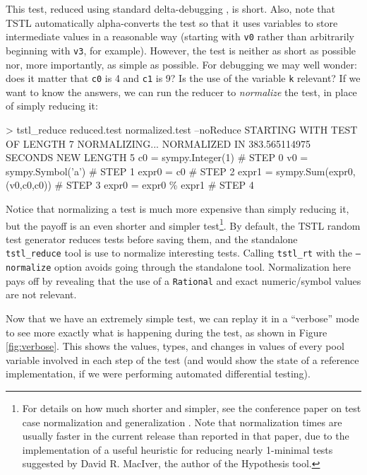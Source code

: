 This test, reduced using standard delta-debugging \cite{DD}, is
short.  Also, note that TSTL automatically alpha-converts the test so
that it uses variables to store intermediate values in a reasonable
way (starting with {\tt v0} rather than arbitrarily beginning with
{\tt v3}, for example).  However, the test is neither as short as possible nor, more
importantly, as simple as possible.  For debugging we may well wonder:
does it matter that {\tt c0} is 4 and {\tt c1} is 9?  Is the use of
the variable {\tt k} relevant?  If we want to know the answers, we can
run the reducer to \emph{normalize} \cite{OneTest} the test, in place
of simply reducing it:

{\scriptsize
\begin{code}
 > tstl\_reduce reduced.test normalized.test --noReduce
 STARTING WITH TEST OF LENGTH 7
 NORMALIZING...
 NORMALIZED IN 383.565114975 SECONDS
 NEW LENGTH 5
 c0 = sympy.Integer(1)                            \# STEP 0
 v0 = sympy.Symbol('a')                           \# STEP 1
 expr0 = c0                                       \# STEP 2
 expr1 = sympy.Sum(expr0,(v0,c0,c0))              \# STEP 3
 expr0 = expr0 \% expr1                            \# STEP 4
\end{code}
}

Notice that normalizing a test is much more expensive than simply
reducing it, but the payoff is an even shorter and simpler
test\footnote{For details on how much shorter and simpler, see the
  conference paper on test case normalization and generalization
  \cite{OneTest}.  Note that normalization times are usually faster in
the current release than reported in that paper, due to the
implementation of a useful heuristic for reducing nearly 1-minimal
tests suggested by David R. MacIver, the author of the Hypothesis tool.}.  By default, the TSTL random test generator
reduces tests before saving them, and the standalone {\tt
  tstl\_reduce} tool is use to normalize interesting tests.  Calling
{\tt tstl\_rt} with the {\tt --normalize} option avoids going through
the standalone tool.  Normalization here pays off by revealing that
the use of a {\tt Rational} and exact numeric/symbol values are not
relevant.  

Now that we have an extremely simple test, we can replay it in a
``verbose'' mode to see more exactly what is happening during the test, as shown in
Figure \ref{fig:verbose}.  This shows the values, types, and changes
in values of every pool variable involved in each step of the test
(and would show the state of a reference implementation, if we were
performing automated differential testing).

